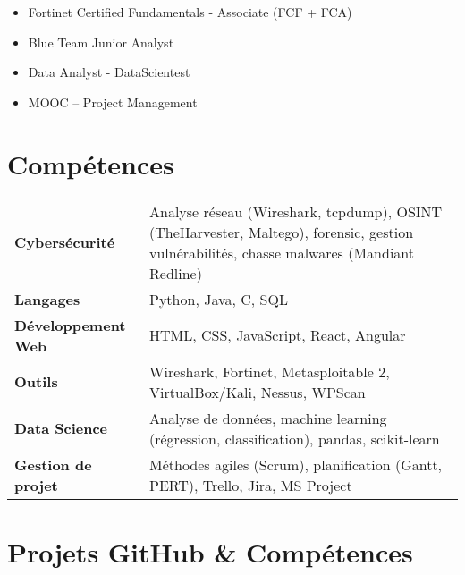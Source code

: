 \documentclass[a4paper,10pt]{article}
\begin{document}
\begin{itemize}[leftmargin=*]
    \item Fortinet Certified Fundamentals -  Associate (FCF + FCA) 
    \item Blue Team Junior Analyst
    \item Data Analyst - DataScientest 
    \item MOOC – Project Management
\end{itemize}

\section*{Compétences}

\begin{tabular}{p{4cm} p{15cm}}
\textbf{Cybersécurité} & Analyse réseau (Wireshark, tcpdump), OSINT (TheHarvester, Maltego), forensic, gestion vulnérabilités, chasse malwares (Mandiant Redline) \\
\textbf{Langages} & Python, Java, C, SQL \\
\textbf{Développement Web} & HTML, CSS, JavaScript, React, Angular \\
\textbf{Outils} & Wireshark, Fortinet, Metasploitable 2, VirtualBox/Kali, Nessus, WPScan \\
\textbf{Data Science} & Analyse de données, machine learning (régression, classification), pandas, scikit-learn \\
\textbf{Gestion de projet} & Méthodes agiles (Scrum), planification (Gantt, PERT), Trello, Jira, MS Project 
\end{tabular}



\section*{ Projets GitHub \& Compétences }
\end{document}
